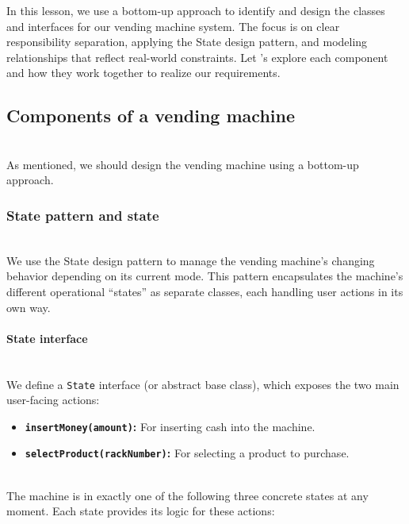 

In this lesson, we use a bottom-up approach to identify and design the classes and interfaces for our vending machine system. The focus is on clear responsibility separation, applying the State design pattern, and modeling relationships that reflect real-world constraints. Let 's explore each component and how they work together to realize our requirements.

\subsection{Components of a vending machine}\label{majDah7EZR35FHwR70wHB}
\\
As mentioned, we should design the vending machine using a bottom-up approach.

\subsubsection{State pattern and state}\label{8-83uQjwRojgfNpsMYQcD}
\\
We use the State design pattern to manage the vending machine's changing behavior depending on its current mode. This pattern encapsulates the machine's different operational ``states'' as separate classes, each handling user actions in its own way.
\\
\paragraph{State interface}\label{kmZNwcRcsZSf6OeCXIj6s}
\\
We define a \texttt{State} interface (or abstract base class), which exposes the two main user-facing actions:

\begin{itemize}
\item
\protect{}\label{etQaKl3SmdqgEXSrWdQvj}
\textbf{\texttt{insertMoney(amount)}:} For inserting cash into the machine.
\item
\protect{}\label{A9ZU1jHBdH-amySgKR1Q9}
\textbf{\texttt{selectProduct(rackNumber)}:} For selecting a product to purchase.
\end{itemize}
\\
The machine is in exactly one of the following three concrete states at any moment. Each state provides its logic for these actions:

